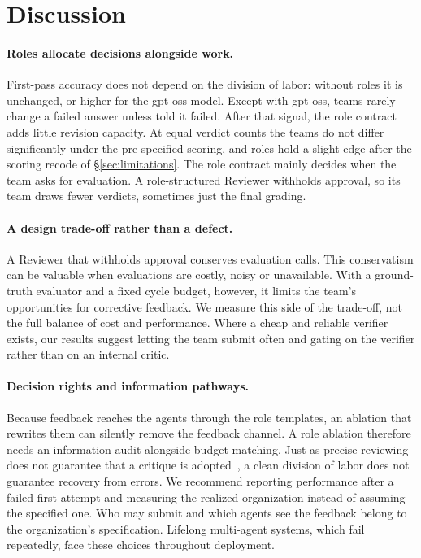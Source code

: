 \section{Discussion}
\label{sec:discussion}

\paragraph{Roles allocate decisions alongside work.} First-pass accuracy
does not depend on the division of labor: without roles it is unchanged, or higher for the gpt-oss model. Except with gpt-oss, teams rarely change a failed answer unless told it
failed. After that signal, the role contract adds little revision capacity. At equal verdict counts the teams do not differ significantly under the
pre-specified scoring, and roles hold a slight edge after the scoring recode of \S\ref{sec:limitations}. The role contract mainly decides when the team asks for evaluation. A role-structured Reviewer
withholds approval, so its team draws fewer verdicts, sometimes just
the final grading.

\paragraph{A design trade-off rather than a defect.} A Reviewer that
withholds approval conserves evaluation calls. This conservatism can be valuable when evaluations are costly, noisy or unavailable. With a
ground-truth evaluator and a fixed cycle budget, however, it limits the
team's opportunities for corrective feedback. We measure this side of the
trade-off, not the full balance of cost and performance. Where a cheap and
reliable verifier exists, our results suggest letting the team submit often and gating on the verifier rather than on an internal critic.

\paragraph{Decision rights and information pathways.} Because feedback
reaches the agents through the role templates, an ablation that rewrites
them can silently remove the feedback channel. A role ablation therefore
needs an information audit alongside budget matching. Just as precise
reviewing does not guarantee that a critique is adopted~\cite{yang2026precise},
a clean division of labor does not guarantee recovery from errors. We recommend reporting performance after a failed first attempt
and measuring the realized organization instead of assuming the specified
one. Who may submit and which agents see the feedback belong to the
organization's specification. Lifelong multi-agent systems, which fail
repeatedly, face these choices throughout deployment.
